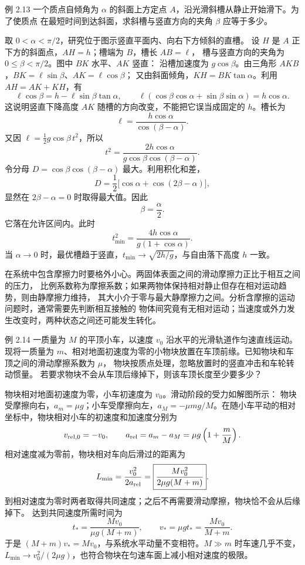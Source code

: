 \begin{origexamplebox}{例 2.13}
一个质点自倾角为 $\alpha$ 的斜面上方定点 $A$，沿光滑斜槽从静止开始滑下。为了使质点
在最短时间到达斜面，求斜槽与竖直方向的夹角 $\beta$ 应等于多少。
\probdiagTwoThirteen
\end{origexamplebox}

\begin{xesolution}
取 $0<\alpha<\pi/2$，研究位于图示竖直平面内、向右下方倾斜的直槽。
设 $H$ 是 $A$ 正下方的斜面点，$AH=h$；槽端为 $B$，槽长 $AB=\ell$，
槽与竖直方向的夹角为 $0\le\beta<\pi/2$。图中 $BK$ 水平、$AK$ 竖直：
\soldiagTwoThirteen
沿槽加速度为 $g\cos\beta$。由三角形 $AKB$，$BK=\ell\sin\beta$、$AK=\ell\cos\beta$；
又由斜面倾角，$KH=BK\tan\alpha$。利用 $AH=AK+KH$，有
\[
 \ell\cos\beta=h-\ell\sin\beta\tan\alpha,
 \qquad \ell(\cos\beta\cos\alpha+\sin\beta\sin\alpha)=h\cos\alpha.
\]
这说明竖直下降高度 $AK$ 随槽的方向改变，不能把它误当成固定的 $h$。槽长为
\[
 \ell=\frac{h\cos\alpha}{\cos(\beta-\alpha)}.
\]
又因 $\ell=\tfrac12g\cos\beta\,t^2$，所以
\[
 t^2=\frac{2h\cos\alpha}
 {g\cos\beta\cos(\beta-\alpha)}.
\]
令分母
$D=\cos\beta\cos(\beta-\alpha)$ 最大。利用积化和差，
\[
 D=\frac12\bigl[\cos\alpha+\cos(2\beta-\alpha)\bigr],
\]
显然在 $2\beta-\alpha=0$ 时取得最大值。因此
\[
  \boxed{\beta=\frac\alpha2}.
\]
它落在允许区间内。此时
\[
 t_{\min}^2=\frac{4h\cos\alpha}{g(1+\cos\alpha)}.
\]
当 $\alpha\to0$ 时，最优槽趋于竖直，$t_{\min}\to\sqrt{2h/g}$，与自由落下高度 $h$ 一致。
\end{xesolution}

在系统中包含摩擦力时要格外小心。两固体表面之间的滑动摩擦力正比于相互之间的压力，
比例系数称为摩擦系数；如果两物体保持相对静止但存在相对运动趋势，则由静摩擦力维持，
其大小介于零与最大静摩擦力之间。分析含摩擦的运动问题时，通常需要先判断相互接触的
物体间究竟有无相对运动；当速度或外力发生改变时，两种状态之间还可能发生转化。

\begin{origexamplebox}{例 2.14}
一质量为 $M$ 的平顶小车，以速度 $v_0$ 沿水平的光滑轨道作匀速直线运动。现将一质量为
$m$、相对地面初速度为零的小物块放置在车顶前缘。已知物块和车顶之间的滑动摩擦系数为 $\mu$，
物块按质点处理，忽略放置时的竖直冲击和车轮转动惯量。
若要求物块不会从车顶后缘掉下，则该车顶长度至少要多少？
\probdiagTwoFourteen
\end{origexamplebox}

\begin{xesolution}
物块相对地面初速度为零，小车初速度为 $v_0$。滑动阶段的受力如解图所示：
\soldiagTwoFourteen
物块受摩擦向右，$a_m=\mu g$；小车受摩擦向左，$a_M=-\mu mg/M$。在随小车平动的相对
坐标中，物块相对小车的初速度和加速度分别为
\[
 v_{\rm rel,0}=-v_0,
 \qquad
 a_{\rm rel}=a_m-a_M=\mu g\left(1+\frac mM\right).
\]
相对速度减为零前，物块相对车向后滑过的距离为
\[
 L_{\min}=\frac{v_0^2}{2a_{\rm rel}}
 =\boxed{\frac{Mv_0^2}{2\mu g(M+m)}}.
\]
到相对速度为零时两者取得共同速度；之后不再需要滑动摩擦，物块恰不会从后缘掉下。
达到共同速度所需时间为
\[
 t_* =\frac{Mv_0}{\mu g(M+m)},\qquad
 v_*=\mu g t_* =\frac{Mv_0}{M+m}.
\]
于是 $(M+m)v_*=Mv_0$，与系统水平动量不变相符。$M\gg m$ 时车速几乎不变，
$L_{\min}\to v_0^2/(2\mu g)$，也符合物块在匀速车面上减小相对速度的极限。
\end{xesolution}

